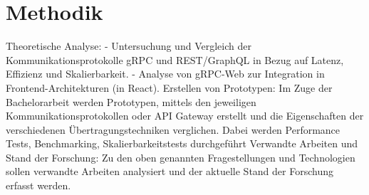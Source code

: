 \section{Methodik}
Theoretische Analyse:
- Untersuchung und Vergleich der Kommunikationsprotokolle gRPC und REST/GraphQL
in Bezug auf Latenz, Effizienz und Skalierbarkeit.
- Analyse von gRPC-Web zur Integration in Frontend-Architekturen (in React).
Erstellen von Prototypen:
Im Zuge der Bachelorarbeit werden Prototypen, mittels den jeweiligen Kommunikationsprotokollen
oder API Gateway erstellt und die Eigenschaften der verschiedenen
Übertragungstechniken verglichen. Dabei werden Performance Tests, Benchmarking,
Skalierbarkeitstests durchgeführt
Verwandte Arbeiten und Stand der Forschung:
Zu den oben genannten Fragestellungen und Technologien sollen verwandte Arbeiten
analysiert und der aktuelle Stand der Forschung erfasst werden.


\chapterend
